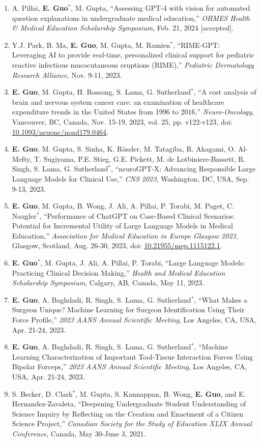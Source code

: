 \documentclass{article}
\begin{document}
\begin{enumerate}
    \item A. Pillai, \textbf{E. Guo}$^*$, M. Gupta, ``Assessing GPT-4 with vision for automated question explanations in undergraduate medical education,'' \textit{OHMES Health \& Medical Education Scholarship Symposium}, Feb. 21, 2024 [accepted].
    \item Y.J. Park, B. Ma, \textbf{E. Guo}, M. Gupta, M. Ramien$^*$, ``RIME-GPT:  Leveraging AI to provide real-time, personalized clinical support for pediatric reactive infectious mucocutaneous eruptions (RIME),'' \textit{Pediatric Dermatology Research Alliance}, Nov. 9-11, 2023.
    \item \textbf{E. Guo}, M. Gupta, H. Rossong, S. Lama, G. Sutherland$^*$, ``A cost analysis of brain and nervous system cancer care: an examination of healthcare expenditure trends in the United States from 1996 to 2016,'' \textit{Neuro-Oncology}, Vancouver, BC, Canada, Nov. 15-19, 2023, vol. 25, pp. v122-v123, doi: \href{https://doi.org/10.1093/neuonc/noad179.0464}{10.1093/neuonc/noad179.0464}.
    \item \textbf{E. Guo}, M. Gupta, S. Sinha, K. R\"ossler, M. Tatagiba, R. Akagami, O. Al-Mefty, T. Sugiyama, P.E. Stieg, G.E. Pickett, M. de Lotbiniere-Bassett, R. Singh, S. Lama, G. Sutherland$^*$, ``neuroGPT-X: Advancing Responsible Large Language Models for Clinical Use,'' \textit{CNS 2023}, Washington, DC, USA, Sep. 9-13, 2023.
    \item \textbf{E. Guo}, M. Gupta, B. Wong, J. Ali, A. Pillai, P. Torabi, M. Paget, C. Naugler$^*$, ``Performance of ChatGPT on Case-Based Clinical Scenarios: Potential for Incremental Utility of Large Language Models in Medical Education,'' \textit{Association for Medical Education in Europe Glasgow 2023}, Glasgow, Scotland, Aug. 26-30, 2023, doi: \href{https://doi.org/10.21955/mep.1115122.1}{10.21955/mep.1115122.1}.
    \item \textbf{E. Guo$^*$}, M. Gupta, J. Ali, A. Pillai, P. Torabi, ``Large Language Models: Practicing Clinical Decision Making,'' \textit{Health and Medical Education Scholarship Symposium}, Calgary, AB, Canada, May 11, 2023.
    \item \textbf{E. Guo}, A. Baghdadi, R. Singh, S. Lama, G. Sutherland$^*$, ``What Makes a Surgeon Unique? Machine Learning for Surgeon Identification Using Their Force Profile,'' \textit{2023 AANS Annual Scientific Meeting}, Los Angeles, CA, USA, Apr. 21-24, 2023.
    \item \textbf{E. Guo}, A. Baghdadi, R. Singh, S. Lama, G. Sutherland$^*$, ``Machine Learning Characterization of Important Tool-Tissue Interaction Forces Using Bipolar Forceps,'' \textit{2023 AANS Annual Scientific Meeting}, Los Angeles, CA, USA, Apr. 21-24, 2023.
    \item S. Becker, D. Clark$^*$, M. Gupta, S. Kannappan, B. Wong, \textbf{E. Guo}, and E. Hernandez-Zavaleta, ``Deepening Undergraduate Student Understanding of Science Inquiry by Reflecting on the Creation and Enactment of a Citizen Science Project,'' \textit{Canadian Society for the Study of Education XLIX Annual Conference}, Canada, May 30-June 3, 2021.
\end{enumerate} \vspace{1em}
\end{document}
